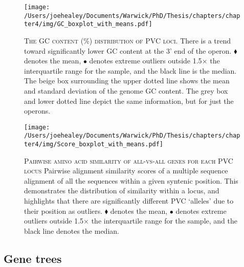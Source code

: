 \newpage
\begin{figure}[h!]
	\centering
	\texttt{[image: /Users/joehealey/Documents/Warwick/PhD/Thesis/chapters/chapter4/img/GC\_boxplot\_with\_means.pdf]}
	\captionsetup{singlelinecheck=off, justification=justified, font=footnotesize, aboveskip=10pt}
	\caption[GC Content of PVC Genes]{\textsc{\normalsize The GC content (\%) distribution of PVC loci.}\vspace{0.1cm} \newline There is a trend toward significantly lower GC content at the 3' end of the operon. $\blacklozenge$ denotes the mean, $\bullet$ denotes extreme outliers outside 1.5$\times$ the interquartile range for the sample, and the black line is the median. The beige box surrounding the upper dotted line shows the mean and standard deviation of the genome GC content. The grey box and lower dotted line depict the same information, but for just the operons.}
	\label{GC}
\end{figure}

\begin{figure}[h!]
	\centering
	\texttt{[image: /Users/joehealey/Documents/Warwick/PhD/Thesis/chapters/chapter4/img/Score\_boxplot\_with\_means.pdf]}
	\captionsetup{singlelinecheck=off, justification=justified, font=footnotesize, aboveskip=10pt}
	\caption[Pairwise Amino Acid Similarity Scores for PVC Proteins]{\textsc{\normalsize Pairwise amino acid similarity of all-vs-all genes for each PVC locus}\vspace{0.1cm} \newline Pairwise alignment similarity scores of a multiple sequence alignment of all the sequences within a given syntenic position. This demonstrates the distribution of similarity within a locus, and highlights that there are significantly different PVC `alleles' due to their position as outliers. $\blacklozenge$ denotes the mean, $\bullet$ denotes extreme outliers outside 1.5$\times$ the interquartile range for the sample, and the black line denotes the median.}
	\label{AAID}
\end{figure}


\newpage
\subsection{Gene trees}

